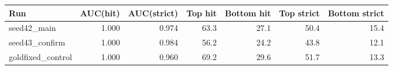 \begin{tabular}{lrrrrrr}
\toprule
Run & AUC(hit) & AUC(strict) & Top hit & Bottom hit & Top strict & Bottom strict \\
\midrule
seed42\_main & 1.000 & 0.974 & 63.3 & 27.1 & 50.4 & 15.4 \\
seed43\_confirm & 1.000 & 0.984 & 56.2 & 24.2 & 43.8 & 12.1 \\
goldfixed\_control & 1.000 & 0.960 & 69.2 & 29.6 & 51.7 & 13.3 \\
\bottomrule
\end{tabular}
